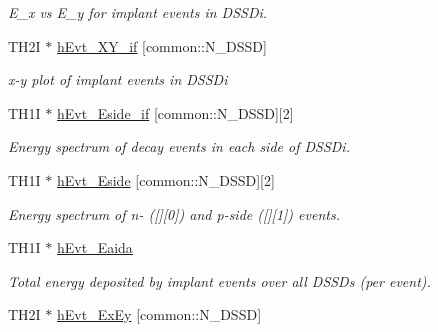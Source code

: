 \begin{DoxyCompactItemize}
\begin{DoxyCompactList}\small\item\em E\-\_\-x vs E\-\_\-y for implant events in D\-S\-S\-Di. \end{DoxyCompactList}\item 
\hypertarget{classAnalysis_acbfac7731e538e0458662fee1126f6ab}{T\-H2\-I $\ast$ \hyperlink{classAnalysis_acbfac7731e538e0458662fee1126f6ab}{h\-Evt\-\_\-\-X\-Y\-\_\-if} \mbox{[}common\-::\-N\-\_\-\-D\-S\-S\-D\mbox{]}}\label{classAnalysis_acbfac7731e538e0458662fee1126f6ab}

\begin{DoxyCompactList}\small\item\em x-\/y plot of implant events in D\-S\-S\-Di \end{DoxyCompactList}\item 
\hypertarget{classAnalysis_a4a9f8a5c8b07b056e186ca9bccb26648}{T\-H1\-I $\ast$ \hyperlink{classAnalysis_a4a9f8a5c8b07b056e186ca9bccb26648}{h\-Evt\-\_\-\-Eside\-\_\-if} \mbox{[}common\-::\-N\-\_\-\-D\-S\-S\-D\mbox{]}\mbox{[}2\mbox{]}}\label{classAnalysis_a4a9f8a5c8b07b056e186ca9bccb26648}

\begin{DoxyCompactList}\small\item\em Energy spectrum of decay events in each side of D\-S\-S\-Di. \end{DoxyCompactList}\item 
\hypertarget{classAnalysis_a110cf8759d4b0fa2919aa248c147c30e}{T\-H1\-I $\ast$ \hyperlink{classAnalysis_a110cf8759d4b0fa2919aa248c147c30e}{h\-Evt\-\_\-\-Eside} \mbox{[}common\-::\-N\-\_\-\-D\-S\-S\-D\mbox{]}\mbox{[}2\mbox{]}}\label{classAnalysis_a110cf8759d4b0fa2919aa248c147c30e}

\begin{DoxyCompactList}\small\item\em Energy spectrum of n-\/ (\mbox{[}\mbox{]}\mbox{[}0\mbox{]}) and p-\/side (\mbox{[}\mbox{]}\mbox{[}1\mbox{]}) events. \end{DoxyCompactList}\item 
\hypertarget{classAnalysis_a04f425299466a505c59cd1c079797f44}{T\-H1\-I $\ast$ \hyperlink{classAnalysis_a04f425299466a505c59cd1c079797f44}{h\-Evt\-\_\-\-Eaida}}\label{classAnalysis_a04f425299466a505c59cd1c079797f44}

\begin{DoxyCompactList}\small\item\em Total energy deposited by implant events over all D\-S\-S\-Ds (per event). \end{DoxyCompactList}\item 
\hypertarget{classAnalysis_ae6241f33d9834740be68fde69c03f753}{T\-H2\-I $\ast$ \hyperlink{classAnalysis_ae6241f33d9834740be68fde69c03f753}{h\-Evt\-\_\-\-Ex\-Ey} \mbox{[}common\-::\-N\-\_\-\-D\-S\-S\-D\mbox{]}}\label{classAnalysis_ae6241f33d9834740be68fde69c03f753}


\end{DoxyCompactItemize}
